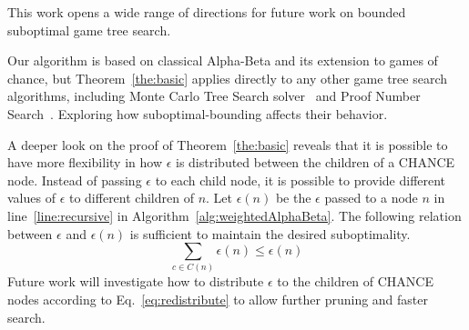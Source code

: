 \documentclass[runningheads]{llncs}
\newcommand{\MM}{\mathit{V}}
\newcommand{\pess}{\mathit{L}}
\newcommand{\opti}{\mathit{U}}
\newcommand{\rootnode}{\mathit{n_1}}
\begin{document}
This work opens a wide range of directions for future work on bounded suboptimal game tree search. 

 Our algorithm is based on classical Alpha-Beta and its extension to games of chance, but Theorem~\ref{the:basic} applies directly to any other game tree search algorithms, including Monte Carlo Tree Search solver~\cite{lanctot2013monte} and Proof Number Search~\cite{allis1994proof}. Exploring how suboptimal-bounding affects their behavior. 


A deeper look on the proof of Theorem~\ref{the:basic} reveals that it is possible to have more flexibility in how $\epsilon$ is distributed between the children of a CHANCE node. Instead of passing $\epsilon$ to each child node, it is possible to provide different values of $\epsilon$ to different children of $n$. 
Let $\epsilon(n)$ be the $\epsilon$ passed to a node $n$ in line~\ref{line:recursive} in Algorithm~\ref{alg:weightedAlphaBeta}. The following relation between $\epsilon$ and $\epsilon(n)$ is sufficient to maintain the desired suboptimality. 
\begin{equation}
	\sum_{c\in C(n)}
			\epsilon(n) \leq \epsilon(n) 
          \label{eq:redistribute}
\end{equation}          
Future work will investigate how to distribute  $\epsilon$ to the children of CHANCE nodes according to Eq.~\ref{eq:redistribute} to allow further pruning and faster search. 
\end{document}
